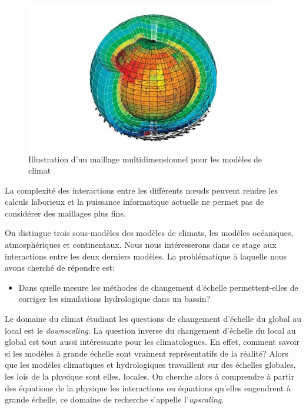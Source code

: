 \documentclass[a4paper,11pt]{article}
\numberwithin{equation}{section}
\begin{document}
\begin{figure}[H]
	\begin{center}
		\includegraphics[scale=0.45]{maillage_terre.jpg}
	\end{center}
	\caption{Illustration d'un maillage multidimensionnel pour les modèles de climat}
	\label{fig-maillage multidimentionnel terre}
\end{figure}

La complexité des interactions entre les différents nœuds peuvent rendre les calculs laborieux et la puissance informatique actuelle ne permet pas de considérer des maillages plus fins.

On distingue trois sous-modèles des modèles de climats, les modèles océaniques, atmosphériques et continentaux. Nous nous intéresserons dans ce stage aux interactions entre les deux derniers modèles. La problématique à laquelle nous avons cherché de répondre est: 
\begin{itemize}
	\item Dans quelle mesure les méthodes de changement d’échelle permettent-elles de corriger les simulations hydrologique dans un bassin?
\end{itemize}

Le domaine du climat étudiant les questions de changement d'échelle du global au local est le \textit{downscaling}. La question inverse du changement d'échelle du local au global est tout aussi intéressante pour les climatologues. En effet, comment savoir si les modèles à grande échelle sont vraiment représentatifs de la réalité? Alors que les modèles climatiques et hydrologiques travaillent sur des échelles globales, les lois de la physique sont elles, locales. On cherche alors à comprendre à partir des équations de la physique les interactions ou équations qu'elles engendrent à grande échelle, ce domaine de recherche s'appelle l'\textit{upscaling}. 
\end{document}
